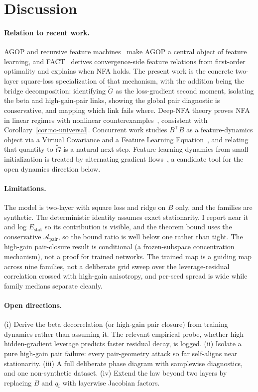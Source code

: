 \documentclass[10pt]{article}
\newcommand{\T}{^{\!\top}}
\newcommand{\pair}{\mathrm{pair}}
\newcommand{\stat}{\mathrm{stat}}
\newcommand{\Gw}{\widetilde{G}}
\begin{document}
\section{Discussion}

\paragraph{Relation to recent work.} AGOP and recursive feature machines~\cite{radhakrishnan2024mechanism} make AGOP a central object of feature learning, and FACT~\cite{boixadsera2025fact} derives convergence-side feature relations from first-order optimality and explains when NFA holds. The present work is the concrete two-layer square-loss specialization of that mechanism, with the addition being the bridge decomposition: identifying $\Gw$ as the loss-gradient second moment, isolating the beta and high-gain-pair links, showing the global pair diagnostic is conservative, and mapping which link fails where. Deep-NFA theory proves NFA in linear regimes with nonlinear counterexamples~\cite{tansley2025nfa}, consistent with Corollary~\ref{cor:no-universal}. Concurrent work studies $B\T B$ as a feature-dynamics object via a Virtual Covariance and a Feature Learning Equation~\cite{cha2026virtual}, and relating that quantity to $\Gw$ is a natural next step. Feature-learning dynamics from small initialization is treated by alternating gradient flows~\cite{kunin2025agf}, a candidate tool for the open dynamics direction below.

\paragraph{Limitations.} The model is two-layer with square loss and ridge on $B$ only, and the families are synthetic. The deterministic identity assumes exact stationarity. I report near it and log $E_{\stat}$ so its contribution is visible, and the theorem bound uses the conservative $\mathcal A_{\pair}$, so the bound ratio is well below one rather than tight. The high-gain pair-closure result is conditional (a frozen-subspace concentration mechanism), not a proof for trained networks. The trained map is a guiding map across nine families, not a deliberate grid sweep over the leverage-residual correlation crossed with high-gain anisotropy, and per-seed spread is wide while family medians separate cleanly.

\paragraph{Open directions.} (i) Derive the beta decorrelation (or high-gain pair closure) from training dynamics rather than assuming it. The relevant empirical probe, whether high hidden-gradient leverage predicts faster residual decay, is logged. (ii) Isolate a pure high-gain pair failure: every pair-geometry attack so far self-aligns near stationarity. (iii) A full deliberate phase diagram with samplewise diagnostics, and one non-synthetic dataset. (iv) Extend the law beyond two layers by replacing $B$ and $q_i$ with layerwise Jacobian factors.
\end{document}
